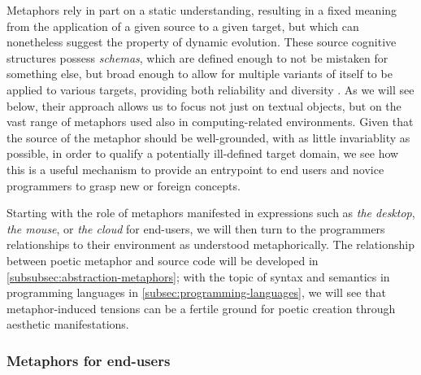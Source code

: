 Metaphors rely in part on a static understanding, resulting in a fixed meaning from the application of a given source to a given target, but which can nonetheless suggest the property of dynamic evolution. These source cognitive structures possess \emph{schemas}, which are defined enough to not be mistaken for something else, but broad enough to allow for multiple variants of itself to be applied to various targets, providing both reliability and diversity \citep{lakoff_metaphors_1980}. As we will see below, their approach allows us to focus not just on textual objects, but on the vast range of metaphors used also in computing-related environments. Given that the source of the metaphor should be well-grounded, with as little invariablity as possible, in order to qualify a potentially ill-defined target domain, we see how this is a useful mechanism to provide an entrypoint to end users and novice programmers to grasp new or foreign concepts.

Starting with the role of metaphors manifested in expressions such as \emph{the desktop}, \emph{the mouse}, or \emph{the cloud} for end-users, we will then turn to the programmers relationships to their environment as understood metaphorically. The relationship between poetic metaphor and source code will be developed in \autoref{subsubsec:abstraction-metaphors}; with the topic of syntax and semantics in programming languages in \autoref{subsec:programming-languages}, we will see that metaphor-induced tensions can be a fertile ground for poetic creation through aesthetic manifestations.

\subsubsection{Metaphors for end-users}
\label{subsubsec:metaphors-users}

